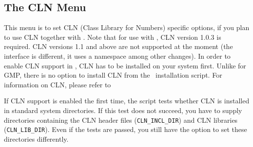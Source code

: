 \subsection{The CLN Menu}\label{sec:cln-menu}

This menu is to set CLN (Class Library for Numbers) specific options,
if you plan to use CLN together with \cgal . Note that for use with
\cgal, CLN version 1.0.3 is required.  CLN versions 1.1 and above are not
supported at the moment (the interface is different, it uses a namespace
among other changes).
In order to enable
CLN support in \cgal, CLN has to be installed on your system first.
Unlike for GMP, there is no option to install CLN from the \cgal\ 
installation script.  For information on CLN, please refer to
\begin{quote}
  \clnpage
\end{quote}

If CLN support is enabled the first time, the script tests whether CLN
is installed in standard system directories. If this test does not
succeed, you have to supply directories containing the CLN header
files (\texttt{CLN\_INCL\_DIR})\TTindex{CLN\_INCL\_DIR} and CLN
libraries ({\tt CLN\_LIB\_DIR}). Even if the
tests are passed, you still have the option to set these directories
differently.\bigskip


